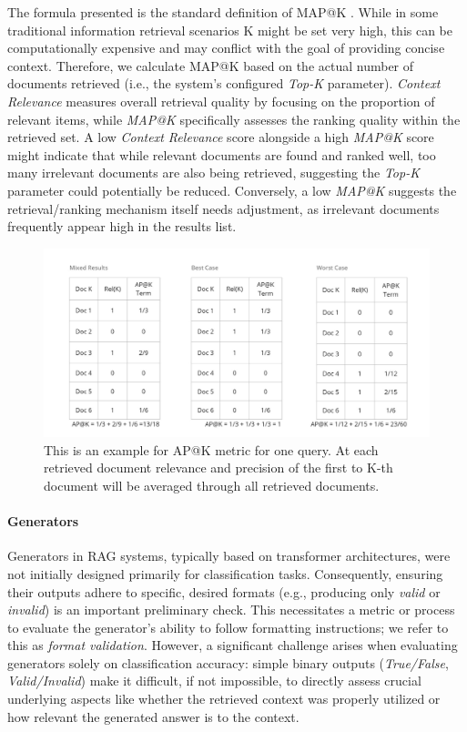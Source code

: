 The formula presented is the standard definition of MAP@K \cite{Lin.13.10.2020}. While in some traditional information retrieval scenarios K might be set very high, this can be computationally expensive and may conflict with the goal of providing concise context. Therefore, we calculate MAP@K based on the actual number of documents retrieved (i.e., the system's configured \textit{Top-K} parameter). \textit{Context Relevance} measures overall retrieval quality by focusing on the proportion of relevant items, while \textit{MAP@K} specifically assesses the ranking quality within the retrieved set. A low \textit{Context Relevance} score alongside a high \textit{MAP@K} score might indicate that while relevant documents are found and ranked well, too many irrelevant documents are also being retrieved, suggesting the \textit{Top-K} parameter could potentially be reduced. Conversely, a low \textit{MAP@K} suggests the retrieval/ranking mechanism itself needs adjustment, as irrelevant documents frequently appear high in the results list.

\begin{figure}
  \centering
  \includegraphics[width=\textwidth]{images/APatK.pdf}
  \caption{This is an example for AP@K metric for one query. At each retrieved document relevance and precision of the first to K-th document will be averaged through all retrieved documents.}
  \label{fig:APatK}
\end{figure}


\paragraph{Generators}
Generators in RAG systems, typically based on transformer architectures, were not initially designed primarily for classification tasks. Consequently, ensuring their outputs adhere to specific, desired formats (e.g., producing only \textit{valid} or \textit{invalid}) is an important preliminary check. This necessitates a metric or process to evaluate the generator's ability to follow formatting instructions; we refer to this as \textit{format validation}. However, a significant challenge arises when evaluating generators solely on classification accuracy: simple binary outputs (\textit{True/False}, \textit{Valid/Invalid}) make it difficult, if not impossible, to directly assess crucial underlying aspects like whether the retrieved context was properly utilized or how relevant the generated answer is to the context.

